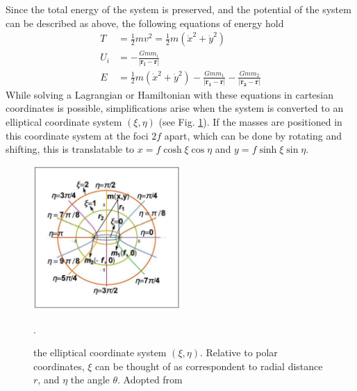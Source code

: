 \documentclass[preprint,titlepage,preprintnumbers,amsmath,amssymb,aps,11pt]{revtex4-2}
\begin{document}
Since the total energy of the system is preserved, and the potential of the system can be described as above, the following equations of energy hold
\begin{equation}
    \begin{aligned}
        T   & =\frac{1}{2}mv^2=\frac{1}{2}m(\dot{x}^2 + \dot{y}^2)                                                 \\
        U_i & =-\frac{Gmm_i}{|\bm{r_i}-\bm{r}|}                                                                    \\
        E   & =\frac{1}{2}m(\dot{x}^2 + \dot{y}^2)-\frac{Gmm_1}{|\bm{r_1}-\bm{r}|}-\frac{Gmm_2}{|\bm{r_2}-\bm{r}|}
    \end{aligned}
\end{equation}
While solving a Lagrangian or Hamiltonian with these equations in cartesian coordinates is possible, simplifications arise when the system is converted to an elliptical coordinate system $(\xi,\eta)$ (see Fig. \ref{fig:coordinatesys}). If the masses are positioned in this coordinate system at the foci $2f$ apart, which can be done by rotating and shifting, this is translatable to $x=f\cosh{\xi}\cos{\eta}$ and $y=f\sinh{\xi}\sin{\eta}$.
\begin{figure}
    \centering
    \includegraphics[width=0.5\textwidth]{Fig 2.png}
    \caption{the elliptical coordinate system $(\xi,\eta)$. Relative to polar coordinates, $\xi$ can be thought of as correspondent to radial distance $r$, and $\eta$ the angle $\theta$. Adopted from \cite{Krishnaswami2019}}.
    \label{fig:coordinatesys}
\end{figure}
\end{document}
